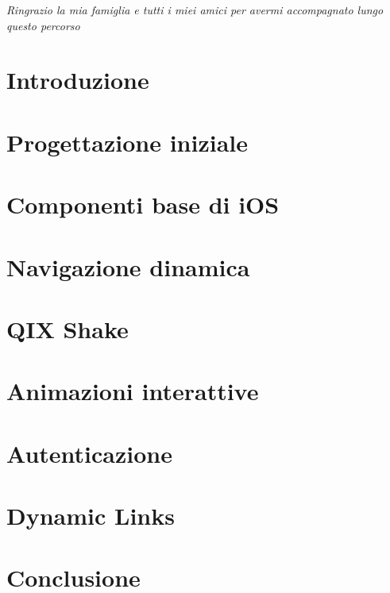 \documentclass[12pt,a4paper]{book}
\newcommand{\intentblankpage}{
    \newpage
    \null
    \vfill
    \thispagestyle{empty}
    \newpage
}
\begin{document}
    
    \intentblankpage
    
    \vspace*{50mm}

    \vspace*{50mm}
    \begin{flushright}
        \textit{\large Ringrazio la mia famiglia e tutti i miei amici per avermi accompagnato lungo questo percorso}
    \end{flushright}
    
    \newpage
    
    \tableofcontents
    
    \chapter*{Introduzione}
    
    
    \chapter{Progettazione iniziale}
    \label{CH:1}
    
    
    \chapter{Componenti base di iOS }
    \label{CH:2}
    

    \chapter{Navigazione dinamica}
    \label{CH:3}
    

    \chapter{QIX Shake}
    \label{CH:4}
    
    
    \chapter{Animazioni interattive}
    \label{CH:5}
    

    \chapter{Autenticazione}
    \label{CH:6}
    
    
    \chapter{Dynamic Links}
    \label{CH:7}
    
    
    \chapter*{Conclusione}
    \label{CH:Concl}
    
    
    
    
    
    \listoffigures
\end{document}
